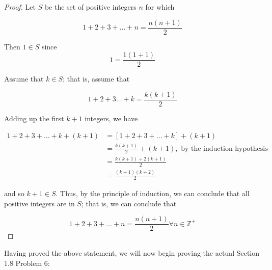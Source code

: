 \documentclass{article}
\begin{document}
    \begin{tcolorbox}[colback = red!10]

        \begin{proof}
        \noindent Let $S$ be the set of positive integers $n$ for which

        \begin{equation*}
            1 + 2 + 3 + \dots + n = \frac{n(n+1)}{2}
        \end{equation*}

        \noindent Then $1\in S$ since
        \begin{equation*}
            1 = \frac{1(1+1)}{2}
        \end{equation*}

        \noindent Assume that $k\in S$; that is, assume that

        \begin{equation*}
            1 + 2 + 3 \dots + k = \frac{k(k+1)}{2}
        \end{equation*}

        \noindent Adding up the first $k+1$ integers, we have

        \begin{align*}
            1 + 2 + 3 + \dots + k + (k+1)   &= [1+2+3+\dots+k] + (k+1) \\
            &= \frac{k(k+1)}{2} + (k+1), \text{ by the induction hypothesis} \\
            &= \frac{k(k+1)+2(k+1)}{2} \\
            &= \frac{(k+1)(k+2)}{2}
        \end{align*}

        \noindent and so $k+1\in S$. Thus, by the principle of induction, we can conclude that all positive integers are in $S$; that is, we can conclude that

        \begin{equation*}
            1 + 2 + 3 + \dots + n = \frac{n(n+1)}{2} \forall n \in \mathbb{Z}^+
        \end{equation*}

        \end{proof}
    \end{tcolorbox}

    \noindent Having proved the above statement, we will now begin proving the actual Section 1.8 Problem 6:
\end{document}
